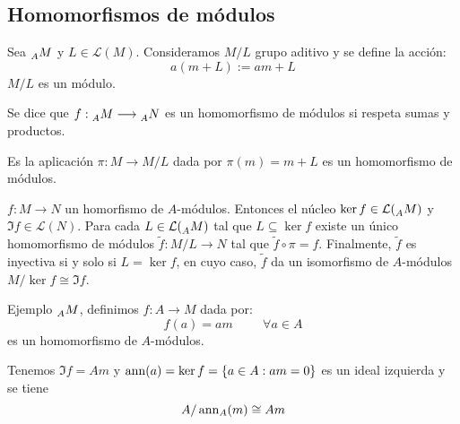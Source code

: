 \subsection{Homomorfismos de módulos}

\begin{df}
  Sea \(\prescript{}{A}{M}\) y \(L\in\mathcal{L}(M)\).
  Consideramos \(M/L\) grupo aditivo y se define la acción:
  \[
    a(m+L):=am+L
  \]
  \(M/L\) es un módulo.
\end{df}

\begin{df}
  Se dice que
  \(f:\prescript{}{A}{M}\longrightarrow \prescript{}{A}{N}\)
  es un homomorfismo de módulos si respeta sumas y productos.
\end{df}

\begin{df}
  Es la aplicación \(\pi:M\longrightarrow M/L\) dada por
  \(\pi(m)=m+L\) es un homomorfismo de módulos.
\end{df}

\begin{teo}
  \(f:M\longrightarrow N\) un homorfismo de \(A\)-módulos. Entonces
  el núcleo \(\ker f\in\mathcal{L}(\prescript{}{A}{M})\) y
  \(\Im f\in\mathcal{L}(N)\). Para cada \(L\in\mathcal{L}
  (\prescript{}{A}{M})\) tal que \(L\subseteq \ker f\) existe
  un único homomorfismo de módulos \(\tilde{f}:M/L\longrightarrow N\)
  tal que \(\tilde{f}\circ\pi=f\). Finalmente, \(\tilde{f}\) es
  inyectiva si y solo si \(L=\ker f\), en cuyo caso, \(\tilde{f}\)
  da un isomorfismo de \(A\)-módulos
  \(M/\ker f\cong \Im f\).
\end{teo}

Ejemplo \(\prescript{}{A}{M}\), definimos \(f:A\longrightarrow M\)
dada por:
\[
  f(a)=am\hspace{1cm} \forall a \in A
\]
es un homomorfismo de \(A\)-módulos.

Tenemos \(\Im f = Am\) y
\(\operatorname{ann}(a)=\ker f=\{a\in A: am=0\}\) es un ideal izquierda y se tiene
\[
  A/\operatorname{ann}_A(m)\cong Am
\]

